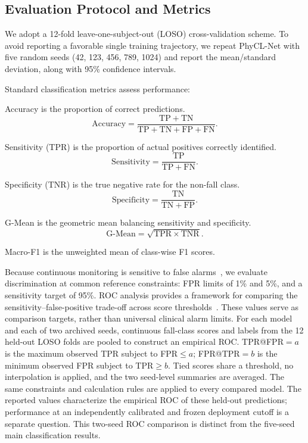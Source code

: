 \documentclass[jec]{acnsart}
\begin{document}
\subsection{Evaluation Protocol and Metrics}

We adopt a 12-fold leave-one-subject-out (LOSO) cross-validation scheme. To avoid reporting a favorable single training trajectory, we repeat PhyCL-Net with five random seeds (42, 123, 456, 789, 1024) and report the mean/standard deviation, along with 95\% confidence intervals.

Standard classification metrics assess performance:

Accuracy is the proportion of correct predictions.
\begin{equation}
\label{eq:accuracy}
\mathrm{Accuracy} = \frac{\mathrm{TP} + \mathrm{TN}}{\mathrm{TP} + \mathrm{TN} + \mathrm{FP} + \mathrm{FN}}.
\end{equation}

Sensitivity (TPR) is the proportion of actual positives correctly identified.
\begin{equation}
\label{eq:sensitivity}
\mathrm{Sensitivity} = \frac{\mathrm{TP}}{\mathrm{TP} + \mathrm{FN}}.
\end{equation}

Specificity (TNR) is the true negative rate for the non-fall class.
\begin{equation}
\label{eq:specificity}
\mathrm{Specificity} = \frac{\mathrm{TN}}{\mathrm{TN} + \mathrm{FP}}.
\end{equation}

G-Mean is the geometric mean balancing sensitivity and specificity.
\begin{equation}
\label{eq:gmean}
\mathrm{G\text{-}Mean} = \sqrt{\mathrm{TPR} \times \mathrm{TNR}}.
\end{equation}

Macro-F1 is the unweighted mean of class-wise F1 scores.

Because continuous monitoring is sensitive to false alarms~\cite{Cvach2012AlarmFatigue}, we evaluate discrimination at common reference constraints: FPR limits of 1\% and 5\%, and a sensitivity target of 95\%. ROC analysis provides a framework for comparing the sensitivity--false-positive trade-off across score thresholds~\cite{Fawcett2006ROC}. These values serve as comparison targets, rather than universal clinical alarm limits. For each model and each of two archived seeds, continuous fall-class scores and labels from the 12 held-out LOSO folds are pooled to construct an empirical ROC. TPR@FPR${=}a$ is the maximum observed TPR subject to FPR${\leq}a$; FPR@TPR${=}b$ is the minimum observed FPR subject to TPR${\geq}b$. Tied scores share a threshold, no interpolation is applied, and the two seed-level summaries are averaged. The same constraints and calculation rules are applied to every compared model. The reported values characterize the empirical ROC of these held-out predictions; performance at an independently calibrated and frozen deployment cutoff is a separate question. This two-seed ROC comparison is distinct from the five-seed main classification results.
\end{document}
